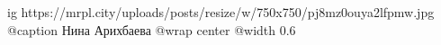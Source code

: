  
 
 
 
 

\ifcmt
  ig https://mrpl.city/uploads/posts/resize/w/750x750/pj8mz0ouya2lfpmw.jpg
	@caption Нина Арихбаева
  @wrap center
  @width 0.6
\fi
